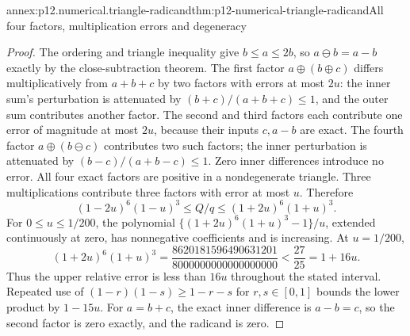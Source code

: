 \begin{annexitem}{annex:p12.numerical.triangle-radicand}{thm:p12-numerical-triangle-radicand}{All four factors, multiplication errors and degeneracy}
\begin{proof}
The ordering and triangle inequality give \(b\leq a\leq2b\), so
\(a\ominus b=a-b\) exactly by the close-subtraction theorem.
The first factor \(a\oplus(b\oplus c)\) differs multiplicatively
from \(a+b+c\) by two factors with errors at most \(2u\): the inner
sum's perturbation is attenuated by \((b+c)/(a+b+c)\leq1\), and
the outer sum contributes another factor. The second and third factors
each contribute one error of magnitude at most \(2u\), because their
inputs \(c,a-b\) are exact. The fourth factor
\(a\oplus(b\ominus c)\) contributes two such factors; the inner
perturbation is attenuated by \((b-c)/(a+b-c)\leq1\).
Zero inner differences introduce no error. All four exact factors are
positive in a nondegenerate triangle. Three multiplications contribute
three factors with error at most \(u\). Therefore
\[
 (1-2u)^6(1-u)^3\leq Q/q\leq(1+2u)^6(1+u)^3.
\]
For \(0\leq u\leq1/200\), the polynomial
\(\{(1+2u)^6(1+u)^3-1\}/u\), extended continuously at zero,
has nonnegative coefficients and is increasing. At \(u=1/200\),
\[
 (1+2u)^6(1+u)^3
 =\frac{8620181596490631201}{8000000000000000000}
 <\frac{27}{25}=1+16u.
\]
Thus the upper relative error is less than \(16u\) throughout the
stated interval. Repeated use of \((1-r)(1-s)\geq1-r-s\) for
\(r,s\in[0,1]\) bounds the lower product by \(1-15u\).
For \(a=b+c\), the exact inner difference is \(a-b=c\), so
the second factor is zero exactly, and the radicand is zero.
\end{proof}
\end{annexitem}

